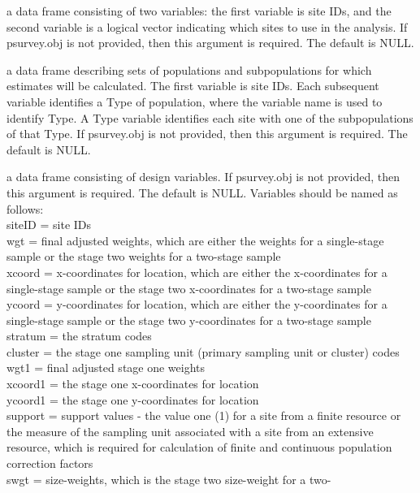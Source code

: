 \begin{Arguments}
\begin{ldescription}
\item[\code{sites}] a data frame consisting of two variables: the first variable is 
site IDs, and the second variable is a logical vector indicating which
sites to use in the analysis.  If psurvey.obj is not provided, then
this argument is required.  The default is NULL.
\item[\code{subpop}] a data frame describing sets of populations and subpopulations 
for which estimates will be calculated.  The first variable is site  
IDs.  Each subsequent variable identifies a Type of population, where
the variable name is used to identify Type.  A Type variable
identifies each site with one of the subpopulations of that Type.  If
psurvey.obj is not provided, then this argument is required.  The
default is NULL.
\item[\code{design}] a data frame consisting of design variables.  If psurvey.obj is
not provided, then this argument is required.  The default is NULL.
Variables should be named as follows:\\
siteID = site IDs\\
wgt = final adjusted weights, which are either the weights for a
single-stage sample or the stage two weights for a two-stage sample\\
xcoord = x-coordinates for location, which are either the x-coordinates
for a single-stage sample or the stage two x-coordinates for a
two-stage sample\\
ycoord = y-coordinates for location, which are either the y-coordinates
for a single-stage sample or the stage two y-coordinates for a
two-stage sample\\
stratum = the stratum codes\\
cluster = the stage one sampling unit (primary sampling unit or cluster)
codes\\
wgt1 = final adjusted stage one weights\\
xcoord1 = the stage one x-coordinates for location\\
ycoord1 = the stage one y-coordinates for location\\
support = support values - the value one (1) for a site from a 
finite resource or the measure of the sampling unit associated 
with a site from an extensive resource, which is required for 
calculation of finite and continuous population correction 
factors\\
swgt = size-weights, which is the stage two size-weight for a two-

\end{ldescription}
\end{Arguments}
